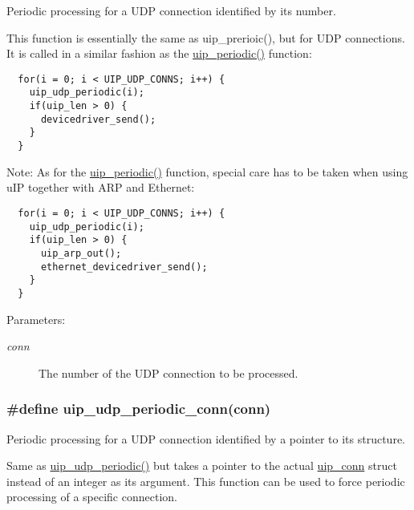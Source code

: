Periodic processing for a UDP connection identified by its number. 

This function is essentially the same as uip\_\-prerioic(), but for UDP connections. It is called in a similar fashion as the \hyperlink{a00063_g1024f8a5fa65e82bf848b2e6590d9628}{uip\_\-periodic()} function: 

\footnotesize\begin{verbatim}  for(i = 0; i < UIP_UDP_CONNS; i++) {
    uip_udp_periodic(i);
    if(uip_len > 0) {
      devicedriver_send();
    }
  }   
\end{verbatim}
\normalsize


\begin{Desc}
\item[Note:]As for the \hyperlink{a00063_g1024f8a5fa65e82bf848b2e6590d9628}{uip\_\-periodic()} function, special care has to be taken when using u\-IP together with ARP and Ethernet: 

\footnotesize\begin{verbatim}  for(i = 0; i < UIP_UDP_CONNS; i++) {
    uip_udp_periodic(i);
    if(uip_len > 0) {
      uip_arp_out();
      ethernet_devicedriver_send();
    }
  }   
\end{verbatim}
\normalsize
\end{Desc}
\begin{Desc}
\item[Parameters:]
\begin{description}
\item[{\em conn}]The number of the UDP connection to be processed. \end{description}
\end{Desc}
\hypertarget{a00063_gf5c2ad5acf3cc23b8262e9ba6a15136b}{
\subsubsection[uip\_\-udp\_\-periodic\_\-conn]{\setlength{\rightskip}{0pt plus 5cm}\#define uip\_\-udp\_\-periodic\_\-conn(conn)}}
\label{a00063_gf5c2ad5acf3cc23b8262e9ba6a15136b}


Periodic processing for a UDP connection identified by a pointer to its structure. 

Same as \hyperlink{a00063_g2c64c8c36bc84f9336f6a2184ea51883}{uip\_\-udp\_\-periodic()} but takes a pointer to the actual \hyperlink{a00028}{uip\_\-conn} struct instead of an integer as its argument. This function can be used to force periodic processing of a specific connection.


